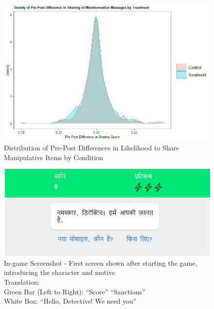 \documentclass[empirical, authordate]{jote-new-article}
\begin{document}
\begin{figure}[h]

  \includegraphics[width=\linewidth]{media/supplement/images3.jpeg}
  \caption{Distribution of Pre-Post Differences in Likelihood to Share Manipulative Items by Condition}
  \label{}


\end{figure}






\begin{figure}

  \includegraphics[width=\linewidth]{media/supplement/images4.jpeg}
  \caption{In-game Screenshot - First screen shown after starting the game, introducing the
    character and motive \\
    Translation: \\
    Green Bar (Left to Right): “Score” “Sanctions” \\
    White Box: “Hello, Detective! We need you”}
  \label{}


\end{figure}
\end{document}

